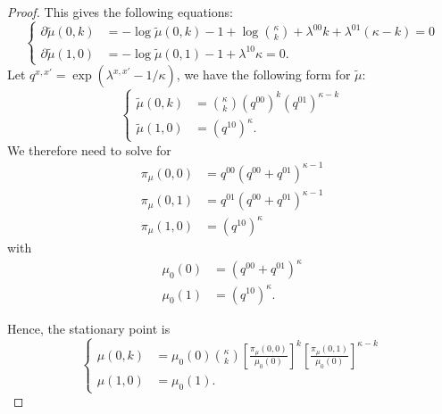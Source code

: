 \documentclass[12pt]{article}
\numberwithin{equation}{section}
\begin{document}
\begin{proof}
    This gives the following equations:
    \begin{equation}
        \begin{cases}
            \partial \tilde{\mu}(0, k) & = -\log \tilde{\mu}(0, k) - 1 + \log {\kappa \choose k} + \lambda^{00} k  + \lambda^{01} (\kappa-k) = 0 \\
            \partial \tilde{\mu}(1, 0) & = -\log \tilde{\mu}(0, 1) - 1 + \lambda^{10} \kappa = 0.
        \end{cases}
    \end{equation}
    Let $q^{x, x'} = \exp\left(\lambda^{x, x'} - 1 / \kappa\right)$, we have the following form for $\tilde{\mu}$:
    \begin{equation}
        \begin{cases}
            \tilde{\mu}(0, k) & = \displaystyle{\kappa \choose k} (q^{00})^k (q^{01})^{\kappa - k} \\
            \tilde{\mu}(1, 0) & = \displaystyle (q^{10})^\kappa.
        \end{cases}
    \end{equation}
    We therefore need to solve for
    \begin{equation}
        \begin{aligned}
            \pi_\mu(0, 0) & = q^{00}(q^{00} + q^{01})^{\kappa-1} \\
            \pi_\mu(0, 1) & = q^{01}(q^{00} + q^{01})^{\kappa-1} \\
            \pi_\mu(1, 0) & = (q^{10})^\kappa
        \end{aligned}
        \label{Eq.HAIS-pimu-q}
    \end{equation}
    with
    \begin{equation}
        \begin{aligned}
            \mu_0(0) & = (q^{00} + q^{01})^{\kappa} \\
            \mu_0(1) & = (q^{10})^\kappa.
        \end{aligned}
    \end{equation}

    Hence, the stationary point is
    \begin{equation*}
        \begin{cases}
            \mu(0, k) & = \displaystyle\mu_0(0){\kappa\choose k}\left[\frac{\pi_\mu(0, 0)}{\mu_0(0)}\right]^k\left[\frac{\pi_\mu(0, 1)}{\mu_0(0)}\right]^{\kappa-k} \\
            \mu(1, 0) & = \displaystyle\mu_0(1).
        \end{cases}
    \end{equation*}


\end{proof}
\end{document}

